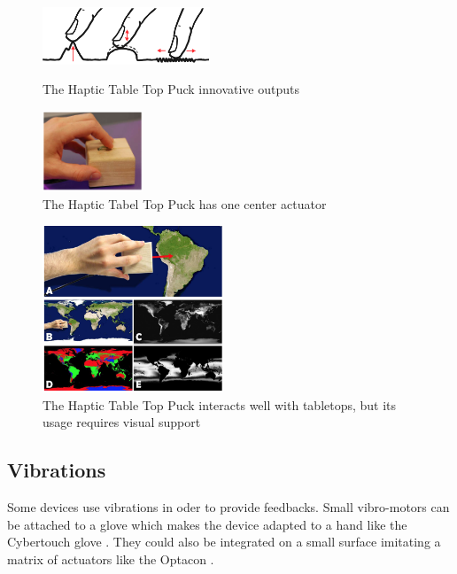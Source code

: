 \begin{figure}[!ht]
	\begin{minipage}[c]{.45\linewidth}
		\centering
		\includegraphics[width=5cm]{figures/puck-d.png}
		\caption{The Haptic Table Top Puck innovative outputs \label{fig:puck-d}}
	\end{minipage}
	\begin{minipage}[c]{.45\linewidth}
		\centering
		\includegraphics[width=3cm]{figures/puck-image.png}
		\caption{The Haptic Tabel Top Puck has one center actuator}
	\end{minipage}
\end{figure}

\begin{figure}[!ht]
	\centering
	\includegraphics[height=5cm]{figures/puck-visual.png}
	\caption{The Haptic Table Top Puck interacts well with tabletops, but its usage requires visual support \label{fig:puck-visual}}
\end{figure}


\subsection{Vibrations}\label{vibrations}

Some devices use vibrations in oder to provide feedbacks. Small
vibro-motors can be attached to a glove which makes the device adapted
to a hand like the Cybertouch glove \cite{astrauskas2008cybertouch}. They could also be
integrated on a small surface imitating a matrix of actuators like the
Optacon \cite{linvill1966direct}.

